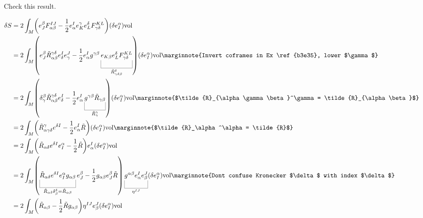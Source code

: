 \documentclass[10pt]{article}
\begin{document}
\begin{example}
	Check this result.
\end{example}
\sol $$
\begin{aligned}
	\delta S &= 2\int_M\p*{e_J^\beta F_{\alpha\beta}^{IJ} - \frac12e_\alpha^Ie_K^\gamma e_L^\delta F_{\gamma\delta}^{KL}}(\delta e_I^\alpha)\vol\\
	&= 2\int_M\p*{e_J^\beta \tilde{R}_{\alpha\beta}^{\gamma\delta}e_\delta^I e_\gamma^J - \frac12e_\alpha^Ig^{\gamma\beta}\ub{e_{K\beta} e_L^\delta F_{\gamma\delta}^{KL}}{\tilde{R}_{\gamma\delta\beta}^\delta}}(\delta e_I^\alpha)\vol\marginnote{Invert coframes in Ex \ref{b3e35}, lower $\gamma$}\\
	&= 2\int_M\p*{\delta_\gamma^\beta\tilde{R}_{\alpha\beta}^{\gamma\delta}e_\delta^I - \frac12e_\alpha^I\ub{g^{\gamma\beta}\tilde{R}_{\gamma\beta}}{\tilde{R}_\gamma^\gamma}}(\delta e_I^\alpha)\vol\marginnote{$\tilde{R}_{\alpha\gamma\beta}^\gamma = \tilde{R}_{\alpha\beta}$}\\
	&= 2\int_M\p*{\tilde{R}_{\alpha\gamma\delta}^{\gamma}e^{\delta I} - \frac12e_\alpha^I\tilde{R}}(\delta e_I^\alpha)\vol\marginnote{$\tilde{R}_\alpha^\alpha = \tilde{R}$}\\
	&= 2\int_M\p*{\tilde{R}_{\alpha\delta}e^{\delta I}e_I^\alpha - \frac12\tilde{R}}e_\alpha^I(\delta e_I^\alpha)\vol\\
	&= 2\int_M\p*{\ub{\tilde{R}_{\alpha\delta}e^{\delta I}e_I^\alpha g_{\alpha\beta}}{\tilde{R}_{\alpha\delta}\delta_\beta^\delta = \tilde{R}_{\alpha\beta}}e_J^\beta - \frac12g_{\alpha\beta}e_J^\beta\tilde{R}}\ub{g^{\alpha\beta}e_\alpha^Ie_\beta^J}{\eta^{IJ}}(\delta e_I^\alpha)\vol\marginnote{Dont confuse Kronecker $\delta$ with index $\delta$}\\
	&= 2\int_M\p*{\tilde{R}_{\alpha\beta} - \frac12\tilde{R}g_{\alpha\beta}}\eta^{IJ}e_\beta^J(\delta e_I^\alpha)\vol
\end{aligned}
$$
\end{document}
